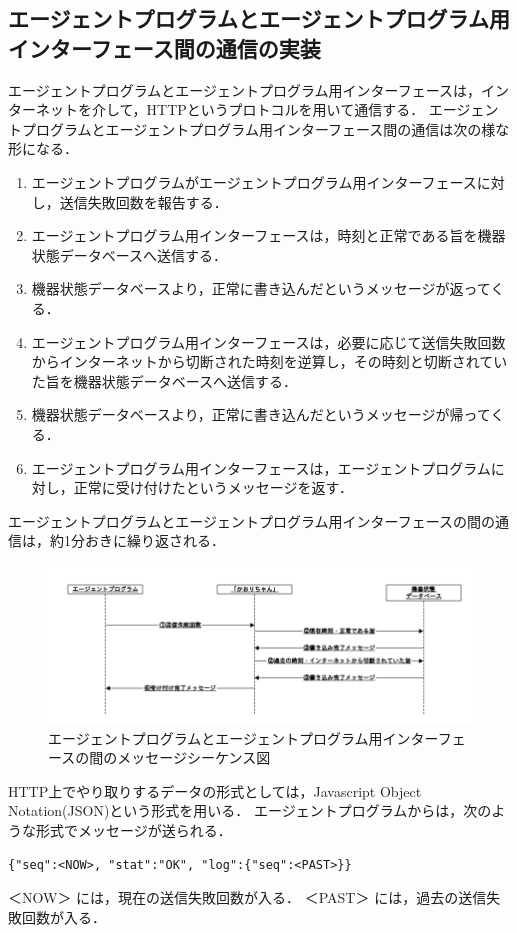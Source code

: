 \subsection{エージェントプログラムとエージェントプログラム用インターフェース間の通信の実装}
エージェントプログラムとエージェントプログラム用インターフェースは，インターネットを介して，HTTPというプロトコルを用いて通信する．
エージェントプログラムとエージェントプログラム用インターフェース間の通信は次の様な形になる．
\begin{enumerate}
	\item エージェントプログラムがエージェントプログラム用インターフェースに対し，送信失敗回数を報告する．
	\item エージェントプログラム用インターフェースは，時刻と正常である旨を機器状態データベースへ送信する．
	\item 機器状態データベースより，正常に書き込んだというメッセージが返ってくる．
	\item エージェントプログラム用インターフェースは，必要に応じて送信失敗回数からインターネットから切断された時刻を逆算し，その時刻と切断されていた旨を機器状態データベースへ送信する．
	\item 機器状態データベースより，正常に書き込んだというメッセージが帰ってくる．
	\item エージェントプログラム用インターフェースは，エージェントプログラムに対し，正常に受け付けたというメッセージを返す．
\end{enumerate}
エージェントプログラムとエージェントプログラム用インターフェースの間の通信は，約1分おきに繰り返される．
\begin{figure}[htbp]
\includegraphics[width=16cm]{images/seq1.png}
\caption{エージェントプログラムとエージェントプログラム用インターフェースの間のメッセージシーケンス図}
\label{fig:blockdiagram}
\end{figure}

HTTP上でやり取りするデータの形式としては，Javascript Object Notation(JSON)という形式を用いる．
エージェントプログラムからは，次のような形式でメッセージが送られる．
\begin{lstlisting}[caption=エージェントプログラムからエージェントプログラム用インターフェースに送られるメッセージの書式,label=format1]
{"seq":<NOW>, "stat":"OK", "log":{"seq":<PAST>}}
\end{lstlisting}
＜NOW＞ には，現在の送信失敗回数が入る．
＜PAST＞ には，過去の送信失敗回数が入る．


